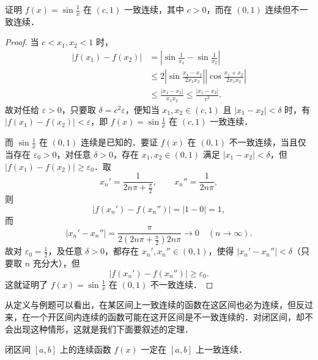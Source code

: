 \begin{example}
证明 $f(x) = \sin\frac{1}{x}$ 在 $(c,1)$ 一致连续，其中 $c > 0$，而在 $(0,1)$ 连续但不一致连续．
\end{example}

\begin{proof}
当 $c < x_1, x_2 < 1$ 时，
\begin{align*}
|f(x_1) - f(x_2)| &= \left|\sin\frac{1}{x_1} - \sin\frac{1}{x_2}\right| \\
&\leqslant 2\left|\sin\frac{x_1 - x_2}{2x_1 x_2}\right|\left|\cos\frac{x_1 + x_2}{2x_1 x_2}\right| \\
&\leqslant \frac{|x_1 - x_2|}{x_1 x_2} \leqslant \frac{|x_1 - x_2|}{c^2}.
\end{align*}
故对任给 $\varepsilon > 0$，只要取 $\delta = c^2 \varepsilon$，便知当 $x_1, x_2 \in (c,1)$ 且 $|x_1 - x_2| < \delta$ 时，有 $|f(x_1) - f(x_2)| < \varepsilon$，即 $f(x) = \sin\frac{1}{x}$ 在 $(c,1)$ 一致连续．

而 $\sin\frac{1}{x}$ 在 $(0,1)$ 连续是已知的．要证 $f(x)$ 在 $(0,1)$ 不一致连续，当且仅当存在 $\varepsilon_0 > 0$，对任意 $\delta > 0$，存在 $x_1, x_2 \in (0,1)$ 满足 $|x_1 - x_2| < \delta$，但 $|f(x_1) - f(x_2)| \geqslant \varepsilon_0$．取
\[
x_n' = \frac{1}{2n\pi + \frac{\pi}{2}}, \qquad x_n'' = \frac{1}{2n\pi},
\]
则
\[
|f(x_n') - f(x_n'')| = |1 - 0| = 1,
\]
而
\[
|x_n' - x_n''| = \frac{\pi}{2(2n\pi + \frac{\pi}{2})2n\pi} \to 0 \quad (n \to \infty).
\]
故对 $\varepsilon_0 = \frac{1}{2}$，及任意 $\delta > 0$，都存在 $x_n', x_n'' \in (0,1)$，使得 $|x_n' - x_n''| < \delta$（只要取 $n$ 充分大），但
\[
|f(x_n') - f(x_n'')| \geqslant \varepsilon_0.
\]
这就证明了 $f(x) = \sin\frac{1}{x}$ 在 $(0,1)$ 不一致连续．
\end{proof}

从定义与例题可以看出，在某区间上一致连续的函数在这区间也必为连续，但反过来，在一个开区间内连续的函数可能在这开区间是不一致连续的．对闭区间，却不会出现这种情形，这就是我们下面要叙述的定理．

\begin{theorem}[康托（Cantor，1845---1918）定理]\label{thm:7-6}
闭区间 $[a,b]$ 上的连续函数 $f(x)$ 一定在 $[a,b]$ 上一致连续．
\end{theorem}


